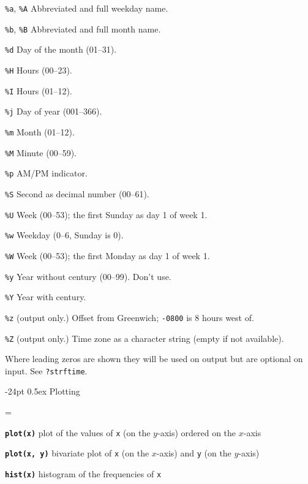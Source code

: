 \documentclass[10pt,landscape]{article}
\makeatletter
\renewcommand\section{\@startsection{section}{1}{0mm}%
                                     {-24pt}%
                                     {0.5ex}%
                                {\color[rgb]{1,0.54902,0}\normalfont\large\bfseries}}
\newcommand{\code}{\texttt}
\newcommand{\bcode}[1]{\texttt{\textbf{#1}}}
\newcommand{\describe}[1]{\begin{description}{#1}\end{description}}
\makeatother
\begin{document}
\begin{multicols*}{3}
  \describe{
\itemsep=0pt\parskip=0pt
    \item{\code{\%a}, \code{\%A}} {Abbreviated and full weekday name.}
    \item{\code{\%b}, \code{\%B}} {Abbreviated and full month name.}
    \item{\code{\%d}} {Day of the month (01--31).}
    \item{\code{\%H}} {Hours (00--23).}
    \item{\code{\%I}} {Hours (01--12).}
    \item{\code{\%j}} {Day of year (001--366).}
    \item{\code{\%m}} {Month (01--12).}
    \item{\code{\%M}} {Minute (00--59).}
    \item{\code{\%p}} {AM/PM indicator. }
    \item{\code{\%S}} {Second as decimal number (00--61).}
    \item{\code{\%U}} {Week (00--53); the first Sunday as day 1 of week 1.}
    \item{\code{\%w}} {Weekday (0--6, Sunday is 0).}
    \item{\code{\%W}} {Week (00--53); the first Monday as day 1 of week 1.}
    \item{\code{\%y}} {Year without century (00--99). Don't use.}
    \item{\code{\%Y}} {Year with century.}
    \item{\code{\%z}} {(output only.) Offset from Greenwich; \code{-0800} is 8 hours west of.}
    \item{\code{\%Z}} {(output only.) Time zone as a character
      string (empty if not available).}
  }

Where leading zeros are shown they will be used on output but are
optional on input. See \code{?strftime}.  





\section{Plotting}

\everypar={\hangindent=9mm}

\bcode{plot(x)}  plot of the values of \code{x} (on the $y$-axis) ordered on the $x$-axis

\bcode{plot(x, y)}  bivariate plot of \code{x} (on the $x$-axis) and \code{y} (on the $y$-axis)

\bcode{hist(x)}  histogram of the frequencies of \code{x}


\end{multicols*}
\end{document}
